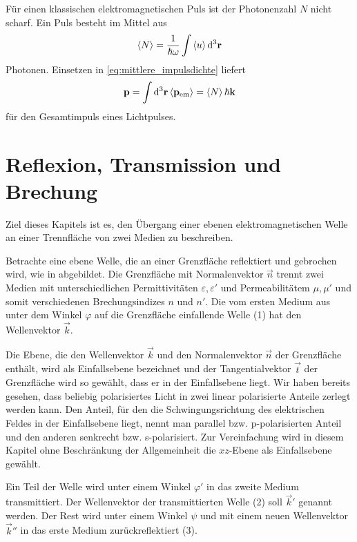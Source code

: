 Für einen klassischen elektromagnetischen Puls ist der Photonenzahl $N$ nicht scharf. Ein Puls besteht im Mittel aus
\begin{align*}
    \left\langle N\right\rangle = \frac{1}{\hbar\omega} \int \left\langle u\right\rangle \diffa[3]{\vec r}
\end{align*}
Photonen. Einsetzen in \eqref{eq:mittlere_impulsdichte} liefert
\begin{align*}
    \vec p = \int\diffa[3]{\vec r}\left\langle\vec p_\mathrm{em}\right\rangle = \left\langle N\right\rangle \hbar\vec k
\end{align*}
für den Gesamtimpuls eines Lichtpulses.




\section{Reflexion, Transmission und Brechung}

Ziel dieses Kapitels ist es, den Übergang einer ebenen elektromagnetischen Welle an einer Trennfläche von zwei Medien zu beschreiben.

Betrachte eine ebene Welle, die an einer Grenzfläche reflektiert und gebrochen wird, wie in  abgebildet.
Die Grenzfläche mit Normalenvektor $\vec n$ trennt zwei Medien mit unterschiedlichen Permittivitäten $\varepsilon,\varepsilon'$ und Permeabilitätem $\mu,\mu'$ und somit verschiedenen Brechungsindizes $n$ und $n'$.
Die vom ersten Medium aus unter dem Winkel $\varphi$ auf die Grenzfläche einfallende Welle (1) hat den Wellenvektor $\vec k$.

Die Ebene, die den Wellenvektor $\vec k$ und den Normalenvektor $\vec n$ der Grenzfläche enthält, wird als Einfallsebene bezeichnet und der Tangentialvektor $\vec t$ der Grenzfläche wird so gewählt, dass er in der Einfallsebene liegt.
Wir haben bereits gesehen, dass beliebig polarisiertes Licht in zwei linear polarisierte Anteile zerlegt werden kann. Den Anteil, für den die Schwingungsrichtung des elektrischen Feldes in der Einfallsebene liegt, nennt man parallel bzw. p-polarisierten Anteil und den anderen senkrecht bzw. s-polarisiert.
Zur Vereinfachung wird in diesem Kapitel ohne Beschränkung der Allgemeinheit die $xz$-Ebene als Einfallsebene gewählt.

Ein Teil der Welle wird unter einem Winkel $\varphi'$ in das zweite Medium transmittiert. Der Wellenvektor der transmittierten Welle (2) soll $\vec k'$ genannt werden.
Der Rest wird unter einem Winkel $\psi$ und mit einem neuen Wellenvektor $\vec k''$ in das erste Medium zurückreflektiert (3).

